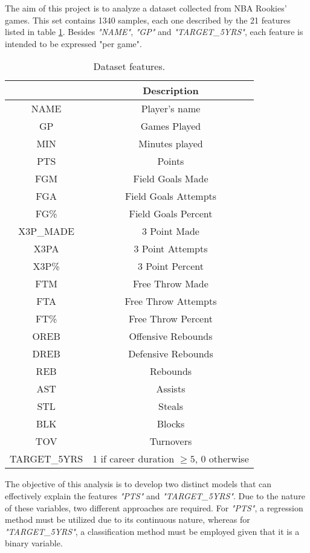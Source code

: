 The aim of this project is to analyze a dataset collected from NBA Rookies' games. This set contains 1340 samples, each one described by the 21 features listed in table \ref{tab:1}. Besides \textit{"NAME"}, \textit{"GP"} and \textit{"TARGET\_5YRS"}, each feature is intended to be expressed "per game".
\begin{table}[h]
	\centering
	\small
	\begin{tabular}{||c | c ||}
		\hline
		& Description\\
		\hline
		NAME & Player's name\\ 
		GP & Games Played\\ 
		MIN & Minutes played\\ 
		PTS & Points\\
		FGM & Field Goals Made\\
		FGA & Field Goals Attempts\\
		FG\% & Field Goals Percent\\
		X3P\_MADE & 3 Point Made\\
		X3PA & 3 Point Attempts\\
		X3P\% & 3 Point Percent\\
		FTM & Free Throw Made\\
		FTA & Free Throw Attempts\\
		FT\% & Free Throw Percent\\
		OREB & Offensive Rebounds\\
		DREB & Defensive Rebounds\\
		REB & Rebounds\\
		AST & Assists\\
		STL & Steals\\
		BLK & Blocks\\
		TOV & Turnovers\\
		TARGET\_5YRS & 1 if career duration $\geq 5$, 0 otherwise\\
		\hline
	\end{tabular}
	\caption{Dataset features.}
	\label{tab:1}
\end{table} 

The objective of this analysis is to develop two distinct models that can effectively explain the features \textit{"PTS"} and \textit{"TARGET\_5YRS"}. Due to the nature of these variables, two different approaches are required. For \textit{"PTS"}, a regression method must be utilized due to its continuous nature, whereas for \textit{"TARGET\_5YRS"}, a classification method must be employed given that it is a binary variable.